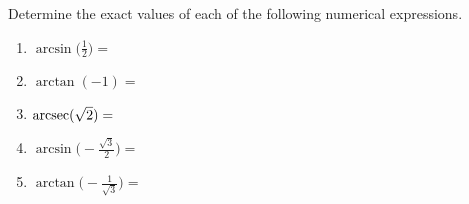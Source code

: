 \documentclass{ximera}
\author{Elizabeth Campolongo}
\begin{document}
\begin{exercise}

Determine the exact values of each of the following numerical expressions.  %
%
\begin{enumerate}
\item $\arcsin\!\Big(\frac{1}{2}\Big) = $
\begin{multipleChoice}
	\choice{$\pi$}
\end{multipleChoice}
%
\item $\arctan(-1) = $
\begin{multipleChoice}
	\choice{$\pi$}
\end{multipleChoice}
%
\item $\operatorname{arcsec}(\sqrt{2}) = $
\begin{multipleChoice}
	\choice{$\pi$}
\end{multipleChoice}
%
\item $\arcsin\!\Big(\!-\frac{\sqrt{3}}{2}\Big) =$
\begin{multipleChoice}
	\choice{$\pi$}
\end{multipleChoice}
%
\item $\arctan\!\Big(\!-\frac{1}{\sqrt{3}}\Big) = $
\begin{multipleChoice}

\end{multipleChoice}
\end{enumerate}
\end{exercise}
\end{document}
